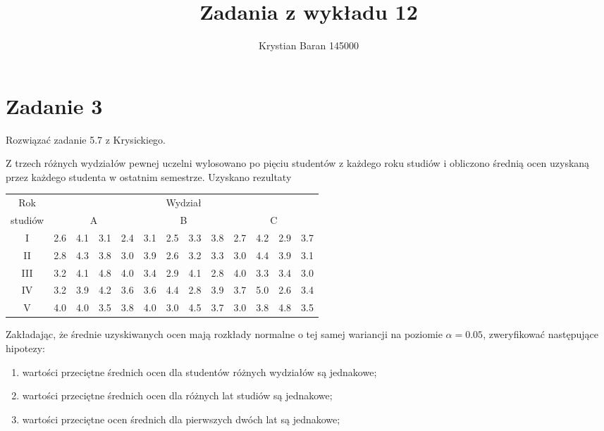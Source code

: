 \documentclass{article}
\author{Krystian Baran 145000}
\title{Zadania z wykładu 12}
\begin{document}
\maketitle
\newpage

\tableofcontents
\newpage

\section{Zadanie 3}
Rozwiązać zadanie 5.7 z Krysickiego. \\ \par

Z trzech różnych wydziałów pewnej uczelni wylosowano po pięciu studentów z każdego roku studiów i obliczono średnią ocen uzyskaną przez każdego studenta w ostatnim semestrze. Uzyskano rezultaty
\begin{center} \begin{tabular}{|c|cccc|cccc|cccc|} \hline
Rok & \multicolumn{12}{|c|}{Wydział} \\ \cline{2-13}
studiów & \multicolumn{4}{|c|}{A} & \multicolumn{4}{|c|}{B} & \multicolumn{4}{|c|}{C} \\ \hline
I & 2.6 & 4.1 & 3.1 & 2.4 & 3.1 & 2.5 & 3.3 & 3.8 & 2.7 & 4.2 & 2.9 & 3.7 \\ 
II & 2.8 & 4.3 & 3.8 & 3.0 & 3.9 & 2.6 & 3.2 & 3.3 & 3.0 & 4.4 & 3.9 & 3.1 \\ 
III & 3.2 & 4.1 & 4.8 & 4.0 & 3.4 & 2.9 & 4.1 & 2.8 & 4.0 & 3.3 & 3.4 & 3.0 \\ 
IV & 3.2 & 3.9 & 4.2 & 3.6 & 3.6 & 4.4 & 2.8 & 3.9 & 3.7 & 5.0 & 2.6 & 3.4 \\ 
V & 4.0 & 4.0 & 3.5 & 3.8 & 4.0 & 3.0 & 4.5 & 3.7 & 3.0 & 3.8 & 4.8 & 3.5 \\ \hline
\end{tabular} \end{center}

Zakładając, że średnie uzyskiwanych ocen mają rozkłady normalne o tej samej wariancji na poziomie $\alpha = 0.05$, zweryfikować następujące hipotezy:
\begin{enumerate}[label = \alph*)]
\item wartości przeciętne średnich ocen dla studentów różnych wydziałów są jednakowe;
\item wartości przeciętne średnich ocen dla różnych lat studiów są jednakowe;
\item wartości przeciętne ocen średnich dla pierwszych dwóch lat są jednakowe;
\end{enumerate}
\end{document}
